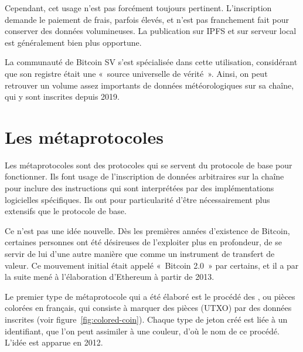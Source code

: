 Cependant, cet usage n'est pas forcément toujours pertinent. L'inscription demande le paiement de frais, parfois élevés, et n'est pas franchement fait pour conserver des données volumineuses. La publication sur IPFS et sur serveur local est généralement bien plus opportune.

La communauté de Bitcoin SV s'est spécialisée dans cette utilisation, considérant que son registre était une «~source universelle de vérité~». Ainsi, on peut retrouver un volume assez importants de données météorologiques sur sa chaîne, qui y sont inscrites depuis 2019.

\section*{Les métaprotocoles}

Les métaprotocoles sont des protocoles qui se servent du protocole de base pour fonctionner. Ils font usage de l'inscription de données arbitraires sur la chaîne pour inclure des instructions qui sont interprétées par des implémentations logicielles spécifiques. Ils ont pour particularité d'être nécessairement plus extensifs que le protocole de base.

Ce n'est pas une idée nouvelle. Dès les premières années d'existence de Bitcoin, certaines personnes ont été désireuses de l'exploiter plus en profondeur, de se servir de lui d'une autre manière que comme un instrument de transfert de valeur. Ce mouvement initial était appelé «~Bitcoin 2.0~» par certains, et il a par la suite mené à l'élaboration d'Ethereum à partir de 2013.

Le premier type de métaprotocole qui a été élaboré est le procédé des , ou pièces colorées en français, qui consiste à marquer des pièces (UTXO) par des données inscrites (voir figure~\ref{fig:colored-coin}). Chaque type de jeton créé est liée à un identifiant, que l'on peut assimiler à une couleur, d'où le nom de ce procédé. L'idée est apparue en 2012. %

